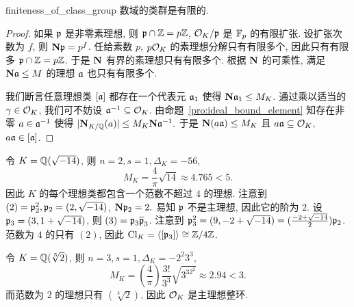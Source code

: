 \begin{theorem}{}{finiteness_of_class_group}
数域的类群是有限的.
\end{theorem}
\begin{proof}
如果 ${\mathfrak{p}}$ 是非零素理想, 则 ${\mathfrak{p}}\cap {\mathbb{Z}}=p{\mathbb{Z}}$, ${\mathcal{O}}_K/{\mathfrak{p}}$ 是 ${\mathbb{F}}_p$ 的有限扩张. 设扩张次数为 $f$, 则 ${\mathbf{N}}{\mathfrak{p}}=p^f$. 任给素数 $p$, $p{\mathcal{O}}_K$ 的素理想分解只有有限多个, 因此只有有限多 ${\mathfrak{p}}\cap {\mathbb{Z}}=p{\mathbb{Z}}$. 于是 ${\mathbf{N}}$ 有界的素理想只有有限多个. 根据 ${\mathbf{N}}$ 的可乘性, 满足 ${\mathbf{N}}{\mathfrak{a}}\le M$ 的理想 ${\mathfrak{a}}$ 也只有有限多个.

我们断言任意理想类 $[{\mathfrak{a}}]$ 都存在一个代表元 ${\mathfrak{a}}_1$ 使得 ${\mathbf{N}}{\mathfrak{a}}_1\le M_K$.
通过乘以适当的 $\gamma\in{\mathcal{O}}_K$, 我们可不妨设 ${\mathfrak{a}}^{-1}\subseteq {\mathcal{O}}_K$. 由命题~\ref{pro:ideal_bound_element} 知存在非零 $a\in{\mathfrak{a}}^{-1}$ 使得 $|{\mathbf{N}}_{K/{\mathbb{Q}}}(a)|\le M_K{\mathbf{N}}{\mathfrak{a}}^{-1}.$
于是 ${\mathbf{N}}(a{\mathfrak{a}})\le M_K$ 且 $a{\mathfrak{a}}\subseteq {\mathcal{O}}_K$, $a{\mathfrak{a}}\in[{\mathfrak{a}}]$.
\end{proof}

\begin{example}
令 $K={\mathbb{Q}}(\sqrt{-14})$, 则 $n=2, s=1,\Delta_K=-56$, 
  \[M_K=\frac{4}{\pi}\sqrt{14}\approx 4.765<5.\]
因此 $K$ 的每个理想类都包含一个范数不超过 $4$ 的理想. 注意到 $(2)={\mathfrak{p}}_2^2,{\mathfrak{p}}_2=(2,\sqrt{-14})$, ${\mathbf{N}}{\mathfrak{p}}_2=2.$ 易知 ${\mathfrak{p}}$ 不是主理想, 因此它的阶为 $2$. 设 ${\mathfrak{p}}_3=(3,1+\sqrt{-14})$, 则 $(3)={\mathfrak{p}}_3\overline {{\mathfrak{p}}}_3$. 注意到 ${\mathfrak{p}}_3^2=(9,-2+\sqrt{-14})=(\frac{-2+\sqrt{-14}}{2}){\mathfrak{p}}_2$. 范数为 $4$ 的只有 $(2)$, 因此 ${\mathrm{Cl}}_K=\langle{[{\mathfrak{p}}_3]}\rangle\cong{\mathbb{Z}}/4{\mathbb{Z}}$.
\end{example}
\begin{example}
令 $K={\mathbb{Q}}(\sqrt[3]2)$, 则 $n=3, s=1, \Delta_K=-2^2 3^3$,
  \[M_K=\left(\frac{4}{\pi}\right)\frac{3!}{3^3}\sqrt{3^32^2}\approx 2.94<3.\]
而范数为 $2$ 的理想只有 $(\sqrt[3]{2})$, 因此 ${\mathcal{O}}_K$ 是主理想整环.
\end{example}

